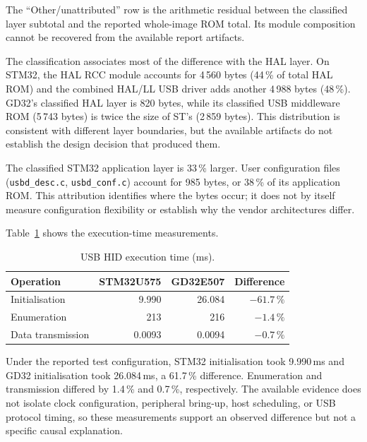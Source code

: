 The ``Other/unattributed'' row is the arithmetic residual between the classified layer
subtotal and the reported whole-image ROM total. Its module composition cannot be recovered
from the available report artifacts.

The classification associates most of the difference with the HAL layer. On STM32, the HAL RCC module accounts for
4\,560 bytes (44\,\% of total HAL ROM) and the combined HAL/LL USB driver adds another
4\,988 bytes (48\,\%). GD32's classified HAL layer is 820 bytes, while its classified USB
middleware ROM (5\,743 bytes) is twice the size of ST's (2\,859 bytes). This distribution is
consistent with different layer boundaries, but the available artifacts do not establish
the design decision that produced them.

The classified STM32 application layer is 33\,\% larger. User configuration files
(\texttt{usbd\_desc.c}, \texttt{usbd\_conf.c}) account for 985 bytes, or 38\,\% of its
application ROM. This attribution identifies where the bytes occur; it does not by itself
measure configuration flexibility or establish why the vendor architectures differ.

Table~\ref{tab:gd32-usb-hid-exec} shows the execution-time measurements.

\begin{table}[H]
  \centering
  \caption{USB HID execution time (ms).}
  \label{tab:gd32-usb-hid-exec}
  \begin{tabular}{l r r r}
    \toprule
    \textbf{Operation} & \textbf{STM32U575} & \textbf{GD32E507} & \textbf{Difference} \\
    \midrule
    Initialisation      & 9.990  & 26.084 & $-61.7\,\%$ \\
    Enumeration         & 213    & 216    & $-1.4\,\%$ \\
    Data transmission   & 0.0093 & 0.0094 & $-0.7\,\%$ \\
    \bottomrule
  \end{tabular}
\end{table}

Under the reported test configuration, STM32 initialisation took 9.990\,ms and GD32
initialisation took 26.084\,ms, a 61.7\,\% difference. Enumeration and transmission differed
by 1.4\,\% and 0.7\,\%, respectively. The available evidence does not isolate clock
configuration, peripheral bring-up, host scheduling, or USB protocol timing, so these
measurements support an observed difference but not a specific causal explanation.

